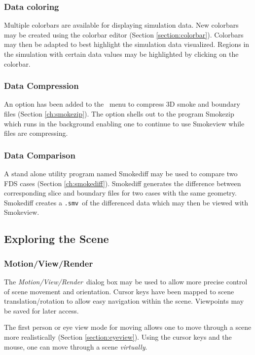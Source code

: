 \documentclass[11pt,twoside]{book}
\begin{document}
\subsubsection{Data coloring} Multiple colorbars are available for displaying simulation data.
New colorbars may be created using the colorbar editor (Section \ref{section:colorbar}).
Colorbars may then be adapted to best highlight the simulation data visualized.
Regions in the simulation with certain data values may be highlighted by clicking
on the colorbar.

\subsubsection{Data Compression} An option has been added to the
\ menu to compress 3D smoke and boundary
files (Section \ref{ch:smokezip}). The option shells out to the program Smokezip which runs in
the background enabling one to continue to use Smokeview while
files are compressing.

\subsubsection{Data Comparison} A stand alone utility program named Smokediff
may be used to compare two FDS cases (Section \ref{ch:smokediff}).
Smokediff generates the difference between corresponding slice and boundary
files for two cases with the same geometry.  Smokediff creates a
{\tt .smv}\ of the differenced data which may then be viewed with Smokeview.


\subsection{Exploring the Scene}

\subsubsection{Motion/View/Render} The {\em Motion/View/Render}\ dialog box may be used to
allow more precise control of scene movement and orientation.
Cursor keys have been mapped to scene translation/rotation to
allow easy navigation within the scene.  Viewpoints may be saved for later access.

The first person or eye view mode for moving
allows one to move through a scene more
realistically (Section \ref{section:eyeview}).  Using the cursor keys and the
mouse, one can move through a scene {\em virtually}.
\end{document}

